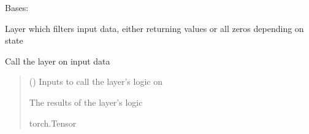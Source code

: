 \documentclass[letterpaper,10pt,english]{sphinxmanual}
\begin{document}
\begin{fulllineitems}
\label{\detokenize{beyondml.pt.layers:beyondml.pt.layers.FilterLayer.FilterLayer}}
\pysigstartsignatures
{}
\pysigstopsignatures
\sphinxAtStartPar
Bases: 

\sphinxAtStartPar
Layer which filters input data, either returning values or all zeros depending on state

\begin{fulllineitems}
\label{\detokenize{beyondml.pt.layers:beyondml.pt.layers.FilterLayer.FilterLayer.forward}}
\pysigstartsignatures
{}
\pysigstopsignatures
\sphinxAtStartPar
Call the layer on input data
\begin{quote}\begin{description}
\sphinxAtStartPar
{} () \textendash{} Inputs to call the layer’s logic on

\sphinxAtStartPar
{} \textendash{} The results of the layer’s logic

\sphinxAtStartPar
torch.Tensor

\end{description}\end{quote}

\end{fulllineitems}


\begin{fulllineitems}
\label{\detokenize{beyondml.pt.layers:beyondml.pt.layers.FilterLayer.FilterLayer.is_on}}
\pysigstartsignatures
{}
\pysigstopsignatures
\end{fulllineitems}


\end{fulllineitems}
\end{document}
